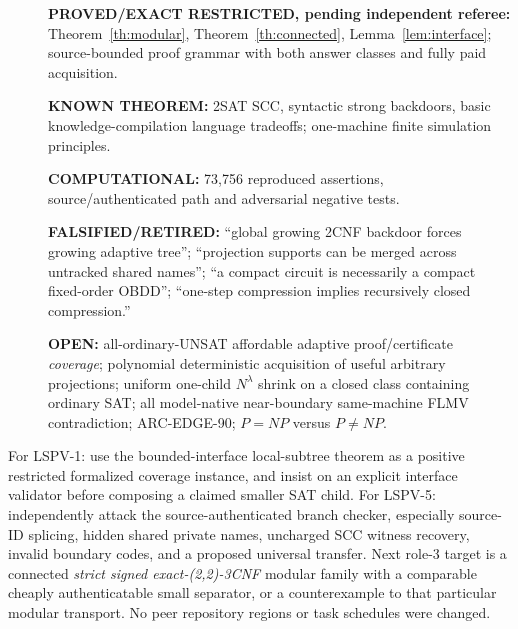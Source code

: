 \documentclass[11pt]{article}
\begin{document}
\begin{description}
\item[] \textbf{PROVED/EXACT RESTRICTED, pending independent referee:} Theorem~\ref{th:modular}, Theorem~\ref{th:connected}, Lemma~\ref{lem:interface}; source-bounded proof grammar with both answer classes and fully paid acquisition.
\item[] \textbf{KNOWN THEOREM:} 2SAT SCC, syntactic strong backdoors, basic knowledge-compilation language tradeoffs; one-machine finite simulation principles.
\item[] \textbf{COMPUTATIONAL:} 73,756 reproduced assertions, source/authenticated path and adversarial negative tests.
\item[] \textbf{FALSIFIED/RETIRED:} ``global growing 2CNF backdoor forces growing adaptive tree''; ``projection supports can be merged across untracked shared names''; ``a compact circuit is necessarily a compact fixed-order OBDD''; ``one-step compression implies recursively closed compression.''
\item[] \textbf{OPEN:} all-ordinary-UNSAT affordable adaptive proof/certificate \emph{coverage}; polynomial deterministic acquisition of useful arbitrary projections; uniform one-child $N^\lambda$ shrink on a closed class containing ordinary SAT; all model-native near-boundary same-machine FLMV contradiction; ARC-EDGE-90; $P=NP$ versus $P\ne NP$.
\end{description}

For LSPV-1: use the bounded-interface local-subtree theorem as a positive restricted formalized coverage instance, and insist on an explicit interface validator before composing a claimed smaller SAT child. For LSPV-5: independently attack the source-authenticated branch checker, especially source-ID splicing, hidden shared private names, uncharged SCC witness recovery, invalid boundary codes, and a proposed universal transfer. Next role-3 target is a connected \emph{strict signed exact-(2,2)-3CNF} modular family with a comparable cheaply authenticatable small separator, or a counterexample to that particular modular transport. No peer repository regions or task schedules were changed.
\end{document}
